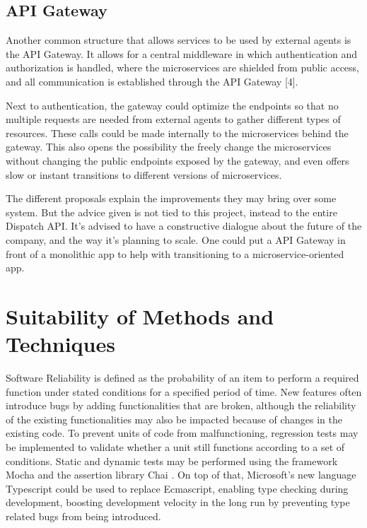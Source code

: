 \clearpage

\subsection{API Gateway}
Another common structure that allows services to be used by external agents is the API Gateway. It allows for a central middleware in which authentication and authorization is handled, where the microservices are shielded from public access, and all communication is established through the API Gateway [4].

Next to authentication, the gateway could optimize the endpoints so that no multiple requests are needed from external agents to gather different types of resources. These calls could be made internally to the microservices behind the gateway. This also opens the possibility the freely change the microservices without changing the public endpoints exposed by the gateway, and even offers slow or instant transitions to different versions of microservices.

The different proposals explain the improvements they may bring over some system. But the advice given is not tied to this project, instead to the entire Dispatch API. It’s advised to have a constructive dialogue about the future of the company, and the way it’s planning to scale. One could put a API Gateway in front of a monolithic app to help with transitioning to a microservice-oriented app.

%
\section{Suitability of Methods and Techniques}
Software Reliability is defined as the probability of an item to perform a required function under stated conditions for a specified period of time. New features often introduce bugs by adding functionalities that are broken, although the reliability of the existing functionalities may also be impacted because of changes in the existing code. To prevent units of code from malfunctioning, regression tests may be implemented to validate whether a unit still functions according to a set of conditions. Static and dynamic tests may be performed using the framework Mocha \cite{mocha} and the assertion library Chai \cite{chai}. On top of that, Microsoft’s new language Typescript could be used to replace Ecmascript, enabling type checking during development, boosting development velocity in the long run by preventing type related bugs from being introduced.


